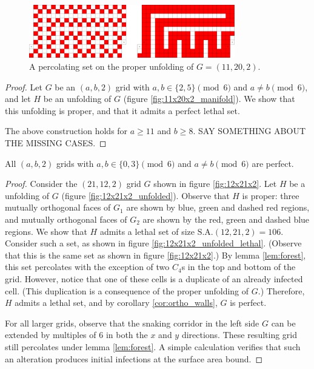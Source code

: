\begin{figure}[]
\centering
\includegraphics[width=0.8\textwidth]{figures/4/11x20x2_unfolded_lethal.pdf}
\caption{A percolating set on the proper unfolding of $G= (11,20,2)$.}
\label{fig:11x20x2_unfolded_lethal}
\end{figure} 

\begin{proof}
Let $G$ be an $(a,b,2)$ grid with $a,b \in \{2,5\} \pmod 6$ and $a \neq b \pmod 6$, and let $H$ be an unfolding of $G$ (figure \ref{fig:11x20x2_manifold}). We show that this unfolding is proper, and that it admits a perfect lethal set. 

The above construction holds for $a \geq 11$ and $b \geq 8$. SAY SOMETHING ABOUT THE MISSING CASES.
\end{proof}


\begin{con}
All $(a,b,2)$ grids with $a,b \in \{0,3\} \pmod 6$ and $a \neq b \pmod 6$ are perfect. 
\end{con}

\begin{proof}
Consider the $(21,12,2)$ grid $G$ shown in figure \ref{fig:12x21x2}. Let $H$ be a unfolding of $G$ (figure \ref{fig:12x21x2_unfolded}). Observe that $H$ is proper: three mutually orthogonal faces of $G_1$ are shown by blue, green and dashed red regions, and mutually orthogonal faces of $G_2$ are shown by the red, green and dashed blue regions. We show that $H$ admits a lethal set of size $\text{S.A.}(12,21,2) = 106$. Consider such a set, as shown in figure \ref{fig:12x21x2_unfolded_lethal}. (Observe that this is the same set as shown in figure \ref{fig:12x21x2}.) By lemma \ref{lem:forest}, this set percolates with the exception of two $C_4$s in the top and bottom of the grid. However, notice that one of these cells is a duplicate of an already infected cell. (This duplication is a consequence of the proper unfolding of $G$.) Therefore, $H$ admits a lethal set, and by corollary \ref{cor:ortho_walls}, $G$ is perfect.

For all larger grids, observe that the snaking corridor in the left side $G$ can be extended by multiples of 6 in both the $x$ and $y$ directions. These resulting grid still percolates under lemma \ref{lem:forest}. A simple calculation verifies that such an alteration produces initial infections at the surface area bound. 
\end{proof}

